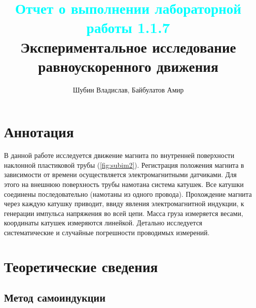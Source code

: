 \documentclass[
	a4paper, %
	12pt, %
]{article}
\title{
	\textcolor{cyan}{Отчет о выполнении лабораторной работы 1.1.7}
	\\
	Экспериментальное исследование равноускоренного движения
}
\author{Шубин Владислав, Байбулатов Амир}
\begin{document}
    
	
	\maketitle
	
	\section{Аннотация}
	В данной работе исследуется движение магнита по внутренней поверхности наклонной пластиковой
	трубы (\ref{fig:subim2}). Регистрация положения магнита в зависимости от времени осуществляется электромагнитными датчиками. Для этого на внешнюю поверхность трубы намотана система катушек. Все катушки соединены последовательно (намотаны из одного провода). Прохождение магнита через каждую катушку приводит, ввиду явления электромагнитной индукции, к генерации импульса напряжения во всей цепи. Масса груза измеряется весами, координаты катушек измеряются линейкой. Детально исследуется систематические и случайные погрешности проводимых измерений.
	
	
	\section{Теоретические сведения}
	
	\subsection{Метод самоиндукции}
	
\end{document}
